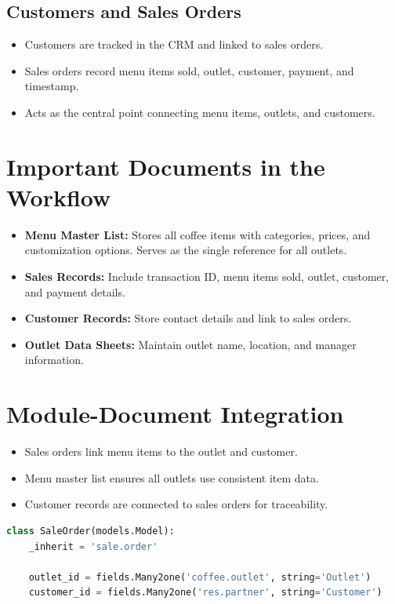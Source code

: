 \subsection*{Customers and Sales Orders}
\begin{itemize}
    \item Customers are tracked in the CRM and linked to sales orders.  
    \item Sales orders record menu items sold, outlet, customer, payment, and timestamp.  
    \item Acts as the central point connecting menu items, outlets, and customers.
\end{itemize}

\section*{Important Documents in the Workflow}
\begin{itemize}
    \item \textbf{Menu Master List:} Stores all coffee items with categories, prices, and customization options. Serves as the single reference for all outlets.  
    \item \textbf{Sales Records:} Include transaction ID, menu items sold, outlet, customer, and payment details.  
    \item \textbf{Customer Records:} Store contact details and link to sales orders.  
    \item \textbf{Outlet Data Sheets:} Maintain outlet name, location, and manager information.
\end{itemize}

\section*{Module-Document Integration}
\begin{itemize}
    \item Sales orders link menu items to the outlet and customer.  
    \item Menu master list ensures all outlets use consistent item data.  
    \item Customer records are connected to sales orders for traceability.
\end{itemize}

\begin{lstlisting}[language=Python, caption={Example: Linking Outlet and Customer in Sales Order}]
class SaleOrder(models.Model):
    _inherit = 'sale.order'

    outlet_id = fields.Many2one('coffee.outlet', string='Outlet')
    customer_id = fields.Many2one('res.partner', string='Customer')
\end{lstlisting}

